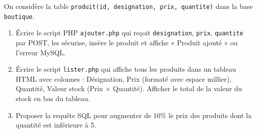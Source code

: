 \documentclass[11pt]{article}
\begin{document}
\begin{exercice}
On considère la table \texttt{produit(id, designation, prix, quantite)} dans la base \texttt{boutique}.
\begin{enumerate}
\item Écrire le script PHP \texttt{ajouter.php} qui reçoit \texttt{designation}, \texttt{prix}, \texttt{quantite} par POST, les sécurise, insère le produit et affiche « Produit ajouté » ou l'erreur MySQL.
\item Écrire le script \texttt{lister.php} qui affiche tous les produits dans un tableau HTML avec colonnes : Désignation, Prix (formaté avec espace millier), Quantité, Valeur stock (Prix $\times$ Quantité). Afficher le total de la valeur du stock en bas du tableau.
\item Proposer la requête SQL pour augmenter de 10\% le prix des produits dont la quantité est inférieure à 5.
\end{enumerate}
\end{exercice}
\end{document}
